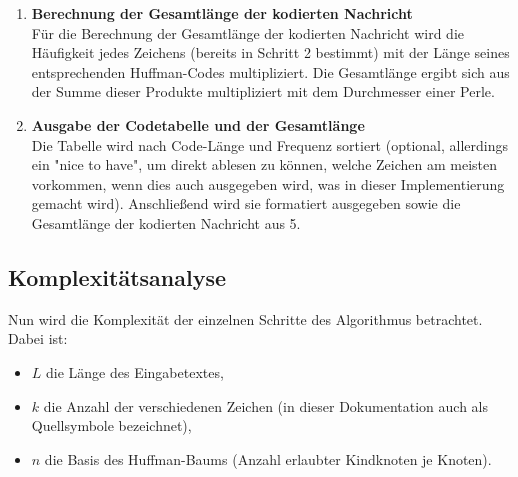 \documentclass[a4paper,10pt,ngerman]{scrartcl}
\begin{document}
\begin{enumerate}
  \item \textbf{Berechnung der Gesamtlänge der kodierten Nachricht} \\
  Für die Berechnung der Gesamtlänge der kodierten Nachricht wird die Häufigkeit jedes Zeichens (bereits in Schritt 2 bestimmt) mit der Länge seines entsprechenden Huffman-Codes multipliziert. Die Gesamtlänge ergibt sich aus der Summe dieser Produkte multipliziert mit dem Durchmesser einer Perle.
  \item \textbf{Ausgabe der Codetabelle und der Gesamtlänge} \\
   Die Tabelle wird nach Code-Länge und Frequenz sortiert (optional, allerdings ein "nice to have", um direkt ablesen zu können, welche Zeichen am meisten vorkommen, wenn dies auch ausgegeben wird, was in dieser Implementierung gemacht wird). Anschließend wird sie formatiert ausgegeben sowie die Gesamtlänge der kodierten Nachricht aus 5. 
\end{enumerate}


\subsection{Komplexitätsanalyse}


Nun wird die Komplexität der einzelnen Schritte des Algorithmus betrachtet. Dabei ist:
\begin{itemize}
  \item $L$ die Länge des Eingabetextes,
  \item $k$ die Anzahl der verschiedenen Zeichen (in dieser Dokumentation auch als Quellsymbole bezeichnet),
  \item $n$ die Basis des Huffman-Baums (Anzahl erlaubter Kindknoten je Knoten).
\end{itemize}

\vspace{0.2cm}
\end{document}

